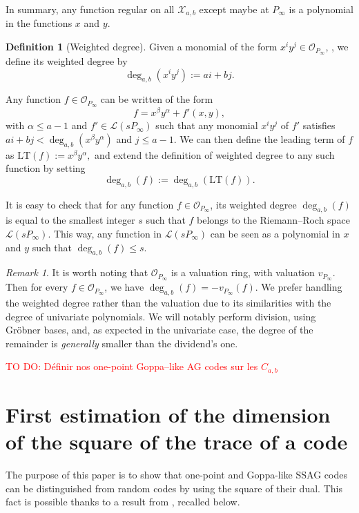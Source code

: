 \documentclass[a4paper]{article}
\theoremstyle{definition}
\newtheorem{definition}[thm]{Definition}
\theoremstyle{remark}
\newtheorem{remark}{Remark}
\newcommand{\calL}{\mathcal{L}}
\newcommand{\calO}{\mathcal{O}}
\newcommand{\calX}{\mathcal{X}}
\newcommand{\degab}[1]{\deg_{a,b}\left(#1\right)}
\newcommand\TODO[1]{\textcolor{red}{TO DO: #1}}
\begin{document}
In summary, any function regular on all $\calX_{a,b}$ except maybe at $P_\infty$ is a polynomial in the functions $x$ and $y$. 

\begin{definition}[Weighted degree]
Given a monomial of the form $x^iy^j \in \calO_{P_\infty}$, , we define its weighted degree by
\[ \degab{x^iy^j} := ai+bj.\]

Any function $f \in \calO_{P_\infty}$ can be written of the form $$f = x^{\beta}y^{\alpha} + f'(x,y),$$
with $\alpha \leq a-1$ and $f' \in \calL(sP_{\infty})$ such that any monomial $x^iy^j$ of $f'$ satisfies $ai+bj < \degab{x^{\beta}y^{\alpha}}$ and $j \leq a-1$. We can then define the leading term of $f$ as $\mathrm{LT}(f) := x^{\beta}y^{\alpha},$ and extend the definition of weighted degree to any such function by setting 
\[\degab{f} := \degab{\mathrm{LT}(f)}.\]
\end{definition}

It is easy to check that for any function $f \in \calO_{P_\infty}$, its weighted degree $\degab{f}$ is equal to the smallest integer $s$ such that $f$ belongs to the Riemann--Roch space $\calL(sP_{\infty})$.
%
This way, any function in $\calL(sP_\infty)$ can be seen as a polynomial in $x$ and $y$ such that $\degab{f}\leq s$. 

\begin{remark}
It is worth noting that $\calO_{P_\infty}$ is a valuation ring, with valuation $v_{P_\infty}$. Then for every $f \in \calO_{P_\infty}$, we have $
\degab{f}=-v_{P_\infty}(f)$. We prefer handling the weighted degree rather than the valuation due to its similarities with the degree of univariate 
polynomials. We will notably perform division, using Gr\"obner bases, and, as expected in the univariate case, the degree of the remainder is 
\textit{generally} smaller than the dividend's one.
\end{remark}

\TODO{Définir nos one-point Goppa--like AG codes sur les $C_{a,b}$}

\section{First estimation of the dimension of the square of the trace of a code}

The purpose of this paper is to show that one-point and Goppa-like SSAG codes   can be distinguished from random codes by using the square of their dual. This fact is possible thanks to a result from \cite{MT21}, recalled below.
\end{document}
